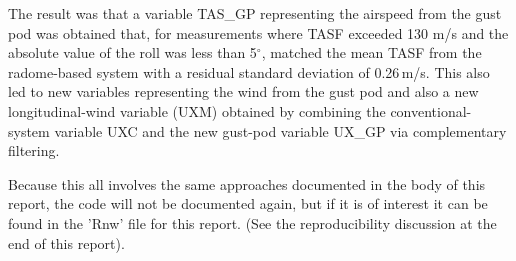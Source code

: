 \documentclass[12pt,twoside,english]{article}\usepackage[]{graphicx}\usepackage[]{color}
\let\OrgIndex\index
\renewcommand*{\index}[1]{\OrgIndex{#1}}
\begin{document}
The result was that a variable TAS\_GP representing the airspeed from the gust pod was obtained that, for measurements where TASF exceeded 130 m/s and the absolute value of the roll was less than 5$^{\circ}$, matched the mean TASF from the radome-based system with a residual standard deviation of 0.26\,m/s. This also led to new variables representing the wind from the gust pod and also a new longitudinal-wind variable (UXM) obtained by combining the conventional-system variable UXC and the new gust-pod variable UX\_GP via complementary filtering. 

Because this all involves the same approaches documented in the body of this report, the code will not be documented again, but if it is of interest it can be found in the 'Rnw' file for this report. (See the reproducibility discussion at the end of this report). 


\end{document}
